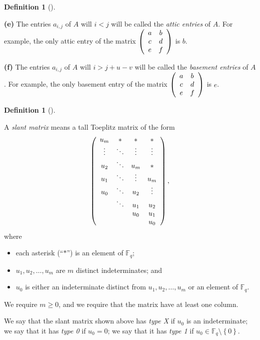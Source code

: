 \documentclass[numbers=enddot,12pt,final,onecolumn,notitlepage]{scrartcl}%
\theoremstyle{definition}
\newtheorem{defi}[theo]{Definition}
\newenvironment{definition}[1][]
{\begin{defi}[#1]\begin{leftbar}}
{\end{leftbar}\end{defi}}
\newcommand{\Fq}{\mathbb{F}_q}
\renewcommand{\geq}{\geqslant}
\theoremstyle{plainsl}
\begin{document}
\begin{definition}
\textbf{(e)} The entries $a_{i,j}$ of $A$ will $i<j$ will be called the
\emph{attic entries} of $A$. For example, the only attic entry of the matrix
$\left(
\begin{array}
[c]{cc}%
a & b\\
c & d\\
e & f
\end{array}
\right)  $ is $b$.

\textbf{(f)} The entries $a_{i,j}$ of $A$ will $i>j+u-v$ will be called the
\emph{basement entries} of $A$. For example, the only basement entry of the
matrix $\left(
\begin{array}
[c]{cc}%
a & b\\
c & d\\
e & f
\end{array}
\right)  $ is $e$.
\end{definition}

\begin{definition}
\label{def.slant}
A \emph{slant matrix} means a tall Toeplitz matrix of the form%
\[
\left(
\begin{array}
[c]{cccc}%
u_{m} & \ast & \ast & \ast\\
\vdots & \ddots & \vdots & \vdots\\
u_{2} & \ddots & u_{m} & \ast\\
u_{1} & \ddots & \vdots & u_{m}\\
u_{0} & \ddots & u_{2} & \vdots\\
& \ddots & u_{1} & u_{2}\\
&  & u_{0} & u_{1}\\
&  &  & u_{0}%
\end{array}
\right)  ,
\]
where

\begin{itemize}
\item each asterisk (``$\ast$'') is an element
of $\Fq$;

\item $u_{1},u_{2},\ldots,u_{m}$ are $m$ distinct indeterminates; and

\item $u_{0}$ is either an indeterminate distinct from $u_{1},u_{2}%
,\ldots,u_{m}$ or an element of $\Fq$.
\end{itemize}

We require $m\geq0$, and we require that the matrix have at least one column.

We say that the slant matrix shown above has \emph{type X} if $u_{0}$ is an
indeterminate; we say that it has \emph{type 0} if $u_{0}=0$; we say that it
has \emph{type 1} if $u_{0}\in \Fq\setminus\left\{  0\right\}  $.
\end{definition}
\end{document}
